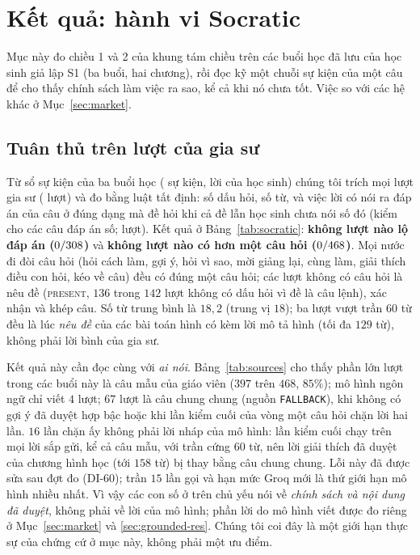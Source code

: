 \section{Kết quả: hành vi Socratic}\label{sec:res-soc}

Mục này đo chiều 1 và 2 của khung tám chiều trên các buổi học đã lưu của học sinh giả lập S1 (ba buổi, hai chương), rồi đọc kỹ một chuỗi sự kiện của một câu để cho thấy chính sách làm việc ra sao, kể cả khi nó chưa tốt. Việc so với các hệ khác ở Mục~\ref{sec:market}.

\subsection{Tuân thủ trên \NTutorMsg{} lượt của gia sư}
Từ sổ sự kiện của ba buổi học (\NEvents{} sự kiện, \NStudentMsg{} lời của học sinh) chúng tôi trích mọi lượt gia sư (\NTutorMsg{} lượt) và đo bằng luật tất định: số dấu hỏi, số từ, và việc lời có nói ra đáp án của câu ở đúng dạng mà đề hỏi khi cả đề lẫn học sinh chưa nói số đó (kiểm cho các câu đáp án số; \NLeakChecked{} lượt). Kết quả ở Bảng~\ref{tab:socratic}: \textbf{không lượt nào lộ đáp án ($0/308{}$)} và \textbf{không lượt nào có hơn một câu hỏi ($0/468{}$)}. Mọi nước đi đòi câu hỏi (hỏi cách làm, gợi ý, hỏi vì sao, mời giảng lại, cùng làm, giải thích điều con hỏi, kéo về câu) đều có đúng một câu hỏi; các lượt không có câu hỏi là nêu đề (\textsc{present}, $136$ trong $142$ lượt không có dấu hỏi vì đề là câu lệnh), xác nhận và khép câu. Số từ trung bình là $18{,}2$ (trung vị $18$); ba lượt vượt trần $60$ từ đều là lúc \emph{nêu đề} của các bài toán hình có kèm lời mô tả hình (tối đa $129$ từ), không phải lời bình của gia sư.

\begin{table}[tp]
\centering
\caption{Hành vi của \NTutorMsg{} lượt gia sư trong các buổi học của S1, theo nước đi. ``Lộ đáp án'': số lượt lộ trên số lượt đã kiểm được (chỉ câu đáp án số).}
\label{tab:socratic}

\end{table}

Kết quả này cần đọc cùng với \emph{ai nói}. Bảng~\ref{tab:sources} cho thấy phần lớn lượt trong các buổi này là câu mẫu của giáo viên ($397$ trên $468$, $85\%$); mô hình ngôn ngữ chỉ viết $4$ lượt; $67$ lượt là câu chung chung (nguồn \texttt{FALLBACK}), khi không có gợi ý đã duyệt hợp bậc hoặc khi lần kiểm cuối của vòng một câu hỏi chặn lời hai lần. $16$ lần chặn ấy không phải lời nháp của mô hình: lần kiểm cuối chạy trên mọi lời sắp gửi, kể cả câu mẫu, với trần cứng $60$ từ, nên lời giải thích đã duyệt của chương hình học (tới $158$ từ) bị thay bằng câu chung chung. Lỗi này đã được sửa sau đợt đo (DI-60); trần $15$ lần gọi và hạn mức Groq mới là thứ giới hạn mô hình nhiều nhất. Vì vậy các con số ở trên chủ yếu nói về \emph{chính sách và nội dung đã duyệt}, không phải về lời của mô hình; phần lời do mô hình viết được đo riêng ở Mục~\ref{sec:market} và \ref{sec:grounded-res}. Chúng tôi coi đây là một giới hạn thực sự của chứng cứ ở mục này, không phải một ưu điểm.

